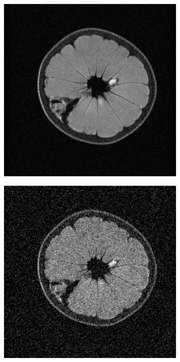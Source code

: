 \begin{figure}[htpb]
\begin{subfigure}{0.33\textwidth}
	\includegraphics[width=1\textwidth]{img/grapeMRILevel1}
\end{subfigure}%
\begin{subfigure}{0.33\textwidth}
	\includegraphics[width=1\textwidth]{img/grapeMRILevel3}

\end{subfigure}
\end{figure}
